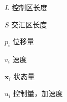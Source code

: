 \begin{denotation}[3cm]
\item[$L$] 控制区长度
\item[$S$] 交汇区长度
\item[$p_i$] 位移量
\item[$v_i$] 速度
\item[$\bm{x}_i$] 状态量
\item[$u_i$] 控制量，加速度

\end{denotation}
